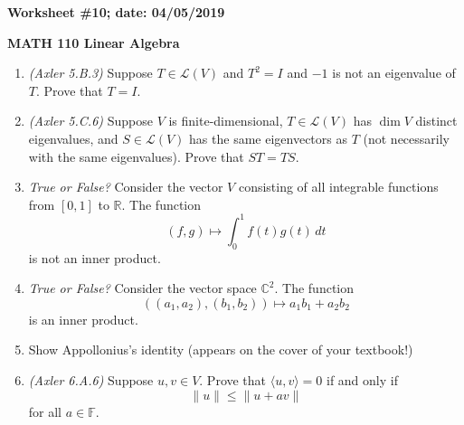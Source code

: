 \documentclass{article}
\newcommand{\RR}{\mathbb{R}}
\newcommand{\CC}{\mathbb{C}}
\newcommand{\cL}{\mathcal{L}}
\begin{document}
{\bf Worksheet \#10; date: 04/05/2019}

{\bf MATH 110 Linear Algebra}

\begin{enumerate}
\item {\em (Axler 5.B.3)} Suppose $T \in \cL(V)$ and $T^2 = I$ and $-1$ is not an eigenvalue of $T$. Prove that $T = I$.

\item {\em (Axler 5.C.6)} Suppose $V$ is finite-dimensional, $T \in \cL(V)$ has $\dim V$ distinct eigenvalues, and $S \in \cL(V)$ has the same eigenvectors as $T$ (not necessarily with the same eigenvalues). Prove that $ST = TS$.

\item {\em True or False?} Consider the vector $V$ consisting of all integrable functions from $[0, 1]$ to $\RR$. The function
\[
(f, g) \mapsto \int_0^1 f(t)g(t) \,dt
\]
is not an inner product.

\item {\em True or False?} Consider the vector space $\CC^2$. The function
\[
((a_1, a_2), (b_1, b_2)) \mapsto a_1 b_1 + a_2 b_2
\]
is an inner product.

\item Show Appollonius's identity (appears on the cover of your textbook!)

\item {\em (Axler 6.A.6)} Suppose $u, v \in V$. Prove that $\langle u, v \rangle = 0$ if and only if
\[
	\|u\| \le \|u + av\|
\]
for all $a \in \mathbb{F}$.
\end{enumerate}
\end{document}
